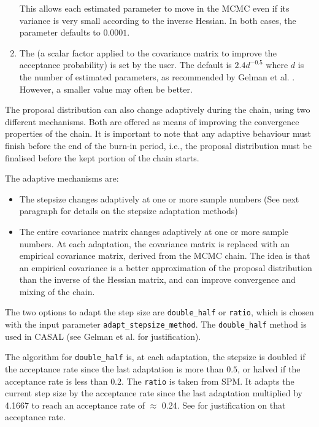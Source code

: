 \begin{enumerate}
This allows each estimated parameter to move in the MCMC even if its variance is very small according to the inverse Hessian. In both cases, the  parameter defaults to $0.0001$.

\item The  (a scalar factor applied to the covariance matrix to improve the acceptance probability) is set by the user. The default is $2.4d^{-0.5}$ where $d$ is the number of estimated parameters, as recommended by Gelman et al. \citep{823}. However, a smaller value may often be better.
\end{enumerate}

The proposal distribution can also change adaptively during the chain, using two different mechanisms. Both are offered as means of improving the convergence properties of the chain. It is important to note that any adaptive behaviour must finish before the end of the burn-in period, i.e., the proposal distribution must be finalised before the kept portion of the chain starts.

The adaptive mechanisms are:

\begin{itemize}
\item The stepsize changes adaptively at one or more sample numbers (See next paragraph for details on the stepsize adaptation methods)
\item The entire covariance matrix changes adaptively at one or more sample numbers. At each adaptation, the covariance matrix is replaced with an empirical covariance matrix, derived from the MCMC chain. The idea is that an empirical covariance is a better approximation of the proposal distribution than the inverse of the Hessian matrix, and can improve convergence and mixing of the chain.
\end{itemize}

The two options to adapt the step size are \texttt{double\_half} or \texttt{ratio}, which is chosen with the input parameter \texttt{adapt\_stepsize\_method}. The \texttt{double\_half} method is used in CASAL (see Gelman et al. \citep{823} for justification).

The algorithm for \texttt{double\_half} is, at each adaptation, the stepsize is doubled if the acceptance rate since the last adaptation is more than $0.5$, or halved if the acceptance rate is less than $0.2$. The \texttt{ratio} is taken from SPM. It adapts the current step size by the acceptance rate since the last adaptation multiplied by 4.1667 to reach an acceptance rate of $\approx$ 0.24. See \cite{mcmc_rate} for justification on that acceptance rate.

